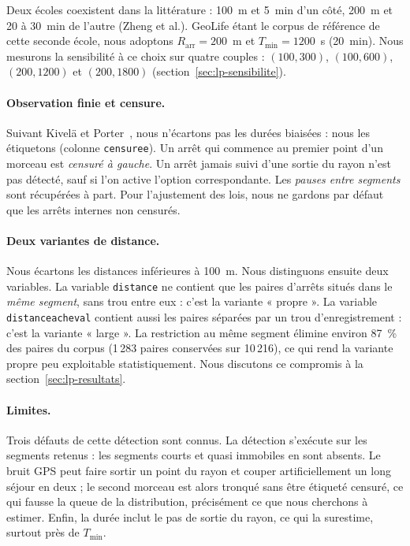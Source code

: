 \documentclass[11pt,a4paper]{article}
\newcommand{\code}[1]{\texttt{#1}}
\renewcommand{\_}{\textunderscore\penalty0\hspace{0pt}}
\begin{document}
Deux écoles coexistent dans la littérature : 100~m et 5~min d'un côté, 200~m et 20 à 30~min
de l'autre (Zheng et al.). GeoLife étant le corpus de référence de cette seconde école, nous
adoptons $R_{\mathrm{arr}}=200$~m et $T_{\min}=1200$~s (20~min). Nous mesurons la sensibilité
à ce choix sur quatre couples : $(100, 300)$, $(100, 600)$, $(200, 1200)$ et $(200, 1800)$
(section~\ref{sec:lp-sensibilite}).

\paragraph{Observation finie et censure.}\label{sec:censure} Suivant Kivelä et
Porter~\cite{kivela2015}, nous n'écartons pas les durées biaisées : nous les étiquetons
(colonne \code{censuree}). Un arrêt qui commence au premier point d'un morceau est
\emph{censuré à gauche}. Un arrêt jamais suivi d'une sortie du rayon n'est pas détecté,
sauf si l'on active l'option correspondante. Les \emph{pauses entre segments} sont
récupérées à part. Pour l'ajustement des lois, nous ne gardons par défaut que les arrêts
internes non censurés.

\paragraph{Deux variantes de distance.} Nous écartons les distances inférieures à 100~m.
Nous distinguons ensuite deux variables. La variable \code{distance} ne contient que les
paires d'arrêts situés dans le \emph{même segment}, sans trou entre eux : c'est la variante
« propre ». La variable \code{distance\_a\_cheval} contient aussi les paires séparées par un
trou d'enregistrement : c'est la variante « large ». La restriction au même segment élimine
environ 87~\% des paires du corpus (1\,283 paires conservées sur 10\,216), ce qui rend la
variante propre peu exploitable statistiquement. Nous discutons ce compromis à la
section~\ref{sec:lp-resultats}.

\paragraph{Limites.} Trois défauts de cette détection sont connus. La détection s'exécute sur
les segments retenus : les segments courts et quasi immobiles en sont absents. Le bruit GPS
peut faire sortir un point du rayon et couper artificiellement un long séjour en deux ; le
second morceau est alors tronqué sans être étiqueté censuré, ce qui fausse la queue de la
distribution, précisément ce que nous cherchons à estimer. Enfin, la durée inclut le pas de
sortie du rayon, ce qui la surestime, surtout près de $T_{\min}$.
\end{document}
